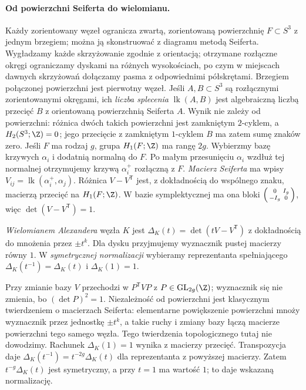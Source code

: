 \paragraph{Od powierzchni Seiferta do wielomianu.}
Każdy zorientowany węzeł ogranicza zwartą, zorientowaną
powierzchnię $F\subset S^3$ z jednym brzegiem; można
ją skonstruować z diagramu metodą Seiferta.
Wygładzamy każde skrzyżowanie zgodnie z orientacją;
otrzymane rozłączne okręgi ograniczamy dyskami na
różnych wysokościach, po czym w miejscach dawnych
skrzyżowań dołączamy pasma z odpowiednimi półskrętami.
Brzegiem połączonej powierzchni jest pierwotny węzeł.
Jeśli $A,B\subset S^3$ są rozłącznymi zorientowanymi
okręgami, ich \emph{liczba splecenia}
$\operatorname{lk}(A,B)$ jest algebraiczną liczbą
przecięć $B$ z orientowaną powierzchnią Seiferta $A$.
Wynik nie zależy od powierzchni: różnica dwóch
takich powierzchni jest zamkniętym $2$-cyklem,
a $H_2(S^3;\Z)=0$; jego przecięcie z zamkniętym
$1$-cyklem $B$ ma zatem sumę znaków zero.
Jeśli $F$ ma rodzaj $g$, grupa $H_1(F;\Z)$ ma rangę $2g$.
Wybierzmy bazę krzywych $\alpha_i$ i dodatnią normalną
do $F$. Po małym przesunięciu $\alpha_i$ wzdłuż tej
normalnej otrzymujemy krzywą $\alpha_i^+$ rozłączną
z $F$. \emph{Macierz Seiferta} ma wpisy
$V_{ij}=\operatorname{lk}(\alpha_i^+,\alpha_j)$.
Różnica $V-V^{\mathsf T}$ jest, z dokładnością do
wspólnego znaku, macierzą przecięć na $H_1(F;\Z)$.
W bazie symplektycznej ma ona bloki
$\begin{psmallmatrix}0&I_g\\-I_g&0\end{psmallmatrix}$,
więc $\det(V-V^{\mathsf T})=1$.

\begin{definicja}
\label{def:alexander-wielomian-20}
\emph{Wielomianem Alexandera} węzła $K$ jest
$\Delta_K(t)=\det(tV-V^{\mathsf T})$ z dokładnością
do mnożenia przez $\pm t^k$. Dla dysku przyjmujemy
wyznacznik pustej macierzy równy $1$.
W \emph{symetrycznej normalizacji} wybieramy
reprezentanta spełniającego
$\Delta_K(t^{-1})=\Delta_K(t)$ i $\Delta_K(1)=1$.
\end{definicja}

Przy zmianie bazy $V$ przechodzi w $P^{\mathsf T}VP$
z $P\in\mathrm{GL}_{2g}(\Z)$; wyznacznik się nie zmienia,
bo $(\det P)^2=1$. Niezależność od powierzchni jest
klasycznym twierdzeniem o macierzach Seiferta:
elementarne powiększenie powierzchni mnoży wyznacznik
przez jednostkę $\pm t^k$, a takie ruchy i zmiany bazy
łączą macierze powierzchni tego samego węzła.
Tego twierdzenia topologicznego tutaj nie dowodzimy.
Rachunek $\Delta_K(1)=1$ wynika z macierzy przecięć.
Transpozycja daje
$\Delta_K(t^{-1})=t^{-2g}\Delta_K(t)$
dla reprezentanta z powyższej macierzy. Zatem
$t^{-g}\Delta_K(t)$ jest symetryczny, a przy $t=1$
ma wartość $1$; to daje wskazaną normalizację.


